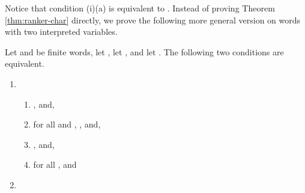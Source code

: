 \documentclass{LMCS}
\begin{document}
Notice that condition (i)(a) is equivalent to . 
Instead of proving Theorem \ref{thm:ranker-char} directly, we prove the
following more general version on words with two interpreted variables.


\begin{thm} \label{thm:structure-variables}
  Let  and  be finite words, let , let , and let . The following two conditions are
  equivalent.
  \begin{enumerate}[\em(i)]
  \item
    \begin{enumerate}[\em(a)]
    \item , and,
    \item for all  and , , and,
    \item , and,
    \item for all ,  and 
    \end{enumerate}
  \item 
  \end{enumerate}
\end{thm}
\end{document}
